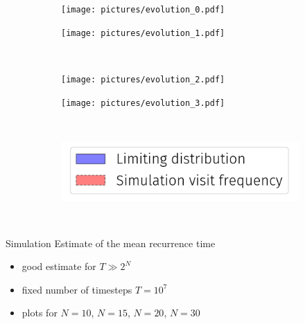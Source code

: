 \begin{frame}
    \begin{figure}
        \begin{subfigure}{.49\textwidth}
            \centering
            \texttt{[image: pictures/evolution\_0.pdf]}
          \end{subfigure}
          \begin{subfigure}{.49\textwidth}
            \centering
            \texttt{[image: pictures/evolution\_1.pdf]}
          \end{subfigure}\\
          \begin{subfigure}{0.49\textwidth}
            \centering
            \texttt{[image: pictures/evolution\_2.pdf]}
          \end{subfigure}%
          \begin{subfigure}{0.49\textwidth}
            \centering
            \texttt{[image: pictures/evolution\_3.pdf]}
        \end{subfigure}\\
        \begin{center}
          \begin{subfigure}{0.4\textwidth}
            \centering
            \includegraphics[width=\linewidth]{pictures/legend.png}
          \end{subfigure}\\
        \end{center}
        \end{figure}
\end{frame}

\begin{frame}{Simulation}
    \Large
    Estimate of the mean recurrence time
    \normalsize
    \begin{itemize}
      \item good estimate for $T \gg 2^N$
      \item fixed number of timesteps $T = 10^7$
      \item plots for $N = 10$, $N = 15$, $N = 20$, $N = 30$
    \end{itemize}
\end{frame}

